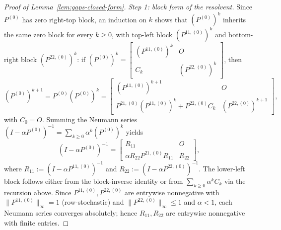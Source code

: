 \documentclass{article}
\theoremstyle{plain}
\theoremstyle{definition}
\begin{document}
\begin{proof}[Proof of Lemma~\ref{lem:gaps-closed-form}]
	\emph{Step 1: block form of the resolvent.} Since $P^{(0)}$ has zero right-top block, an induction on $k$ shows that $(P^{(0)})^k$ inherits the same zero block for every $k \geq 0$, with top-left block $(P^{11,(0)})^k$ and bottom-right block $(P^{22,(0)})^k$: if $(P^{(0)})^k = \begin{bmatrix}(P^{11,(0)})^k & O \\ C_k & (P^{22,(0)})^k\end{bmatrix}$, then
	\begin{equation*}
		(P^{(0)})^{k+1} = P^{(0)}(P^{(0)})^k = \begin{bmatrix}(P^{11,(0)})^{k+1} & O \\ P^{21,(0)}(P^{11,(0)})^k + P^{22,(0)}C_k & (P^{22,(0)})^{k+1}\end{bmatrix},
	\end{equation*}
	with $C_0 = O$. Summing the Neumann series $(I - \alpha P^{(0)})^{-1} = \sum_{k\geq 0}\alpha^k(P^{(0)})^k$ yields
	\begin{equation}\label{eq:resolvent-block}
		(I - \alpha P^{(0)})^{-1} = \begin{bmatrix} R_{11} & O \\ \alpha R_{22}P^{21,(0)}R_{11} & R_{22}\end{bmatrix},
	\end{equation}
	where $R_{11} := (I - \alpha P^{11,(0)})^{-1}$ and $R_{22} := (I - \alpha P^{22,(0)})^{-1}$. The lower-left block follows either from the block-inverse identity or from $\sum_{k\geq 0}\alpha^k C_k$ via the recursion above. Since $P^{11,(0)}, P^{22,(0)}$ are entrywise nonnegative with $\|P^{11,(0)}\|_\infty = 1$ (row-stochastic) and $\|P^{22,(0)}\|_\infty \leq 1$ and $\alpha < 1$, each Neumann series converges absolutely; hence $R_{11}, R_{22}$ are entrywise nonnegative with finite entries.
	

\end{proof}
\end{document}
